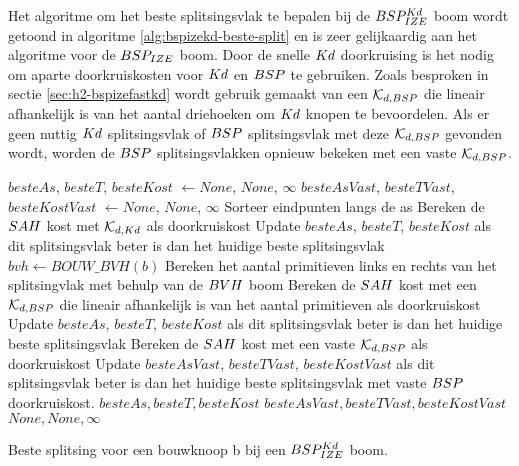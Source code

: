 Het algoritme om het beste splitsingsvlak te bepalen bij de $BSP^{Kd}_{IZE}$ boom wordt getoond in algoritme \ref{alg:bspizekd-beste-split} en is zeer gelijkaardig aan het algoritme voor de $BSP_{IZE}$ boom.
Door de snelle $Kd$ doorkruising is het nodig om aparte doorkruiskosten voor $Kd$ en $BSP$ te gebruiken.
Zoals besproken in sectie \ref{sec:h2-bspizefastkd} wordt gebruik gemaakt van een $\mathcal{K}_{d,BSP}$ die lineair afhankelijk is van het aantal driehoeken om $Kd$ knopen te bevoordelen.
Als er geen nuttig $Kd$ splitsingsvlak of $BSP$ splitsingsvlak met deze $\mathcal{K}_{d,BSP}$ gevonden wordt, worden de $BSP$ splitsingsvlakken opnieuw bekeken met een vaste $\mathcal{K}_{d,BSP}$.
\begin{dutchalgorithm}
    \begin{algorithmic}       
            \State $besteAs$, $besteT$, $besteKost$ $\gets None$, $None$, $\infty$
            \State $besteAsVast$, $besteTVast$, $besteKostVast$ $\gets None$, $None$, $\infty$
                \State Sorteer eindpunten langs de as
                    \State Bereken de $SAH$ kost met $\mathcal{K}_{d,Kd}$ als doorkruiskost
                    \State Update $besteAs$, $besteT$, $besteKost$ als dit splitsingsvlak beter is dan het huidige beste splitsingsvlak
                \EndFor        
            \EndFor
            \State $bvh \gets BOUW\_BVH(b)$
                    \State Bereken het aantal primitieven links en rechts van het splitsingvlak met behulp van de $BVH$ boom
                    \State Bereken de $SAH$ kost met een $\mathcal{K}_{d,BSP}$ die lineair afhankelijk is van het aantal primitieven als doorkruiskost 
                    \State Update $besteAs$, $besteT$, $besteKost$ als dit splitsingsvlak beter is dan het huidige beste splitsingsvlak    
                    \State Bereken de $SAH$ kost met een vaste $\mathcal{K}_{d,BSP}$ als doorkruiskost
                    \State Update $besteAsVast$, $besteTVast$, $besteKostVast$ als dit splitsingsvlak beter is dan het huidige beste splitsingsvlak met vaste $BSP$ doorkruiskost.             
                \EndFor       
            \EndFor
                \State \Return $besteAs, besteT, besteKost$
            \EndIf
                \State \Return $besteAsVast, besteTVast, besteKostVast$
            \EndIf
            \State \Return $None, None, \infty$
        \EndFunction
    \end{algorithmic}
    \caption{Beste splitsing voor een bouwknoop b bij een $BSP^{Kd}_{IZE}$ boom.}
    \label{alg:bspizekd-beste-split}
\end{dutchalgorithm}


